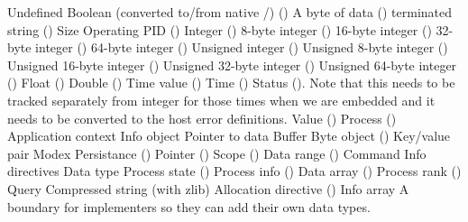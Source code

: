 \begin{constantdesc}
%
Undefined
%
Boolean (converted to/from native /) ()
%
A byte of data ()
%
 terminated string ()
%
Size 
%
Operating \ac{PID} ()
%
Integer ()
%
8-byte integer ()
%
16-byte integer ()
%
32-byte integer ()
%
64-byte integer ()
%
Unsigned integer ()
%
Unsigned 8-byte integer ()
%
Unsigned 16-byte integer ()
%
Unsigned 32-byte integer ()
%
Unsigned 64-byte integer ()
%
Float ()
%
Double ()
%
Time value ()
%
Time ()
%
Status ().
Note that this needs to be tracked separately from integer for those times when we are embedded and it needs to be converted to the host error definitions.
%
Value ()
%
Process ()
%
Application context
%
Info object
%
Pointer to data
%
Buffer
%
Byte object ()
%
Key/value pair
%
Modex
%
Persistance ()
%
Pointer ()
%
Scope ()
%
Data range ()
%
Command
%
Info directives
%
Data type
%
Process state ()
%
Process info ()
%
Data array ()
%
Process rank ()
%
Query
%
Compressed string (with zlib)
%
Allocation directive ()
%
Info array
%
A boundary for implementers so they can add their own data types.
%
\end{constantdesc}


